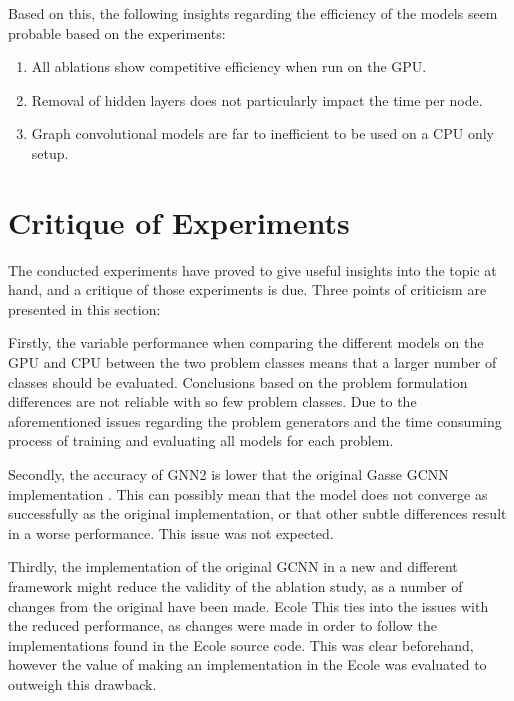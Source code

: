 Based on this, the following insights regarding the efficiency of the models seem probable based on the experiments:
\begin{enumerate}[label=(\roman*)]
    \item All ablations show competitive efficiency when run on the \gls{GPU}.
    \item Removal of hidden layers does not particularly impact the time per node.
    \item Graph convolutional models are far to inefficient to be used on a \gls{CPU} only setup. 
\end{enumerate}






\section{Critique of Experiments}

The conducted experiments have proved to give useful insights into the topic at hand, and a critique of those experiments is due. Three points of criticism are presented in this section:


Firstly, the variable performance when comparing the different models on the \gls{GPU} and \gls{CPU} between the two problem classes means that a larger number of classes should be evaluated. Conclusions based on the problem formulation differences are not reliable with so few problem classes. Due to the aforementioned issues regarding the problem generators and the time consuming process of training and evaluating all models for each problem. 

Secondly, the accuracy of GNN2 is lower that the original Gasse \gls{GCNN} implementation \cite{gasse2019exact}. This can possibly mean that the model does not converge as successfully as the original implementation, or that other subtle differences result in a worse performance. This issue was not expected. 

Thirdly, the implementation of the original \gls{GCNN} in a new and different framework might reduce the validity of the ablation study, as a number of changes from the original have been made.
\gls{Ecole} This ties into the issues with the reduced performance, as changes were made in order to follow the implementations found in the \gls{Ecole} source code. This was clear beforehand, however the value of making an implementation in the \gls{Ecole} was evaluated to outweigh this drawback.



